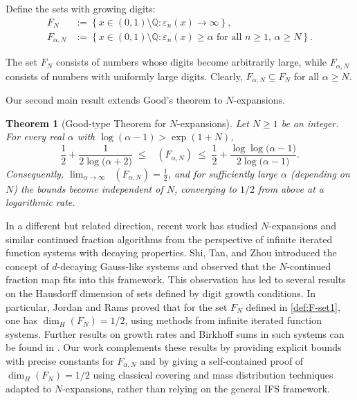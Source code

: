 \documentclass[12pt]{article}
\newtheorem{theorem}{Theorem}[section]
\numberwithin{equation}{section}
\DeclareMathOperator{\dimH}{dim_H}
\begin{document}
Define the sets with growing digits:
\begin{align}
F_N &:= \left\{ x \in (0,1) \setminus \mathbb{Q} : \varepsilon_n(x) \to \infty \right\}, \label{def:F-set1}\\
F_{\alpha, N} &:= \left\{ x \in (0,1) \setminus \mathbb{Q} : \varepsilon_n(x) \geq \alpha \text{ for all } n \geq 1, \, \alpha \geq N \right\}.\label{def:F-set2}
\end{align}

The set $F_N$ consists of numbers whose digits become arbitrarily large, while $F_{\alpha,N}$ consists of numbers with uniformly large digits. Clearly, $F_{\alpha,N} \subseteq F_N$ for all $\alpha \geq N$.

Our second main result extends Good's theorem \cite{Good1941} to $N$-expansions.

\begin{theorem}[Good-type Theorem for $N$-expansions] \label{thm:Good2N}
Let $N \geq 1$ be an integer. For every real $\alpha$ with $\log(\alpha-1) > \exp(1+N)$,
\begin{equation}\label{eq:main-ineq}
\frac12 + \frac{1}{2\log\!\bigl({\alpha}+2\bigr)} 
\;\leq\; 
\dimH(F_{\alpha,N}) 
\;\leq\; 
\frac12 + \frac{\log\log\!\bigl({\alpha}-1\bigr)}{2\log\!\bigl({\alpha}-1\bigr)} .
\end{equation}
Consequently, $\displaystyle \lim_{\alpha \to \infty} \dimH(F_{\alpha,N}) = \frac12$, and {for sufficiently large $\alpha$ (depending on $N$) the bounds become independent of $N$, converging to $1/2$ from above at a logarithmic rate}.
\end{theorem}
%

{In a different but related direction, recent work has studied $N$-expansions and similar continued fraction algorithms from the perspective of infinite iterated function systems with decaying properties. Shi, Tan, and Zhou \cite{STZ26} introduced the concept of $d$-decaying Gauss-like systems and observed that the $N$-continued fraction map fits into this framework. This observation has led to several results on the Hausdorff dimension of sets defined by digit growth conditions. In particular, Jordan and Rams \cite{J12} proved that for the set $F_N$ defined in \eqref{def:F-set1}, one has $\dim_H(F_N) = 1/2$, using methods from infinite iterated function systems. Further results on growth rates and Birkhoff sums in such systems can be found in \cite{L22, Zha20, Zha25}. Our work complements these results by providing explicit bounds with precise constants for $F_{\alpha,N}$ and by giving a self-contained proof of $\dim_H(F_N)=1/2$ using classical covering and mass distribution techniques adapted to $N$-expansions, rather than relying on the general IFS framework.}
\end{document}
